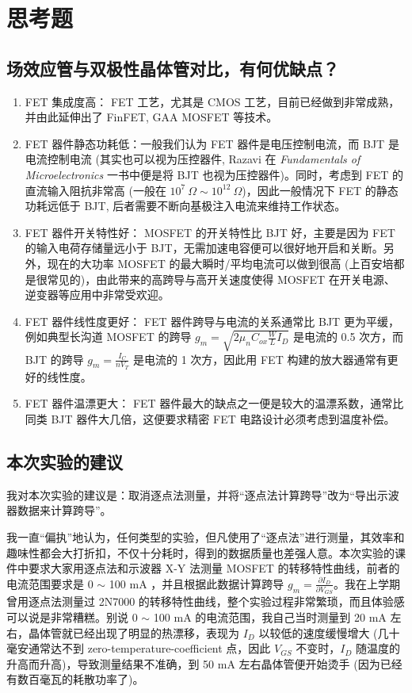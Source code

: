 \documentclass[UTF8]{article}
\begin{document}
\section{思考题}

\subsection{场效应管与双极性晶体管对比，有何优缺点？}

\begin{enumerate}
\item FET 集成度高： FET 工艺，尤其是 CMOS 工艺，目前已经做到非常成熟，并由此延伸出了 FinFET, GAA MOSFET 等技术。
\item FET 器件静态功耗低：一般我们认为 FET 器件是电压控制电流，而 BJT 是电流控制电流 (其实也可以视为压控器件, Razavi 在 \textit{Fundamentals of Microelectronics} 一书中便是将 BJT 也视为压控器件)。同时，考虑到 FET 的直流输入阻抗非常高 (一般在 $10^7 \ \Omega \sim 10^{12}\ \Omega$)，因此一般情况下 FET 的静态功耗远低于 BJT, 后者需要不断向基极注入电流来维持工作状态。
\item FET 器件开关特性好： MOSFET 的开关特性比 BJT 好，主要是因为 FET 的输入电荷存储量远小于 BJT，无需加速电容便可以很好地开启和关断。另外，现在的大功率 MOSFET 的最大瞬时/平均电流可以做到很高 (上百安培都是很常见的)，由此带来的高跨导与高开关速度使得 MOSFET 在开关电源、逆变器等应用中非常受欢迎。
\item FET 器件线性度更好： FET 器件跨导与电流的关系通常比 BJT 更为平缓，例如典型长沟道 MOSFET 的跨导 $g_m = \sqrt{2 \mu_n C_{ox} \frac{W}{L}I_D}$ 是电流的 0.5 次方，而 BJT 的跨导 $g_m = \frac{I_C}{nV_T}$ 是电流的 1 次方，因此用 FET 构建的放大器通常有更好的线性度。
\item FET 器件温漂更大： FET 器件最大的缺点之一便是较大的温漂系数，通常比同类 BJT 器件大几倍，这便要求精密 FET 电路设计必须考虑到温度补偿。
\end{enumerate} 

\subsection{本次实验的建议}

我对本次实验的建议是：取消逐点法测量，并将“逐点法计算跨导”改为“导出示波器数据来计算跨导”。

我一直“偏执”地认为，任何类型的实验，但凡使用了“逐点法”进行测量，其效率和趣味性都会大打折扣，不仅十分耗时，得到的数据质量也差强人意。本次实验的课件中要求大家用逐点法和示波器 X-Y 法测量 MOSFET 的转移特性曲线，前者的电流范围要求是 0 $\sim$ 100 mA ，并且根据此数据计算跨导 $g_m = \frac{\partial I_D }{\partial V_{GS} }$。我在上学期曾用逐点法测量过 2N7000 的转移特性曲线，整个实验过程非常繁琐，而且体验感可以说是非常糟糕。别说 0 $\sim$ 100 mA 的电流范围，我自己当时测量到 20 mA 左右，晶体管就已经出现了明显的热漂移，表现为 $I_D$ 以较低的速度缓慢增大 (几十毫安通常达不到 zero-temperature-coefficient 点，因此 $V_{GS}$ 不变时，$I_D$ 随温度的升高而升高)，导致测量结果不准确，到 50 mA 左右晶体管便开始烫手 (因为已经有数百毫瓦的耗散功率了)。
\end{document}
